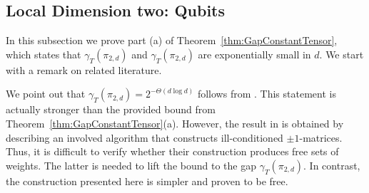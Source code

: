 \subsection{Local Dimension two: Qubits} \label{subsec:Qubits}


In this subsection we prove part (a) of Theorem~\ref{thm:GapConstantTensor}, which states that $\gamma_T(\pi_{2,d})$ and $\gamma_T(\pi_{2,d})$ are exponentially small in $d$. We start with a remark on related literature.

\begin{remark}\label{rem:QubitLiterature}
	We point out that $\gamma_T(\pi_{2,d}) = 2^{-\Theta(d \log d)}$ follows from \cite{alon1997anti}. This statement is actually stronger than the provided bound from Theorem~\ref{thm:GapConstantTensor}(a). However, the result in \cite{alon1997anti} is obtained by describing an involved algorithm that constructs ill-conditioned $\pm 1$-matrices. Thus, it is difficult to verify whether their construction produces free sets of weights. The latter is needed to lift the bound to the gap $\gamma_T(\pi_{2,d})$. In contrast, the construction presented here is simpler and proven to be free.
	\hfill\remSymbol
\end{remark}

